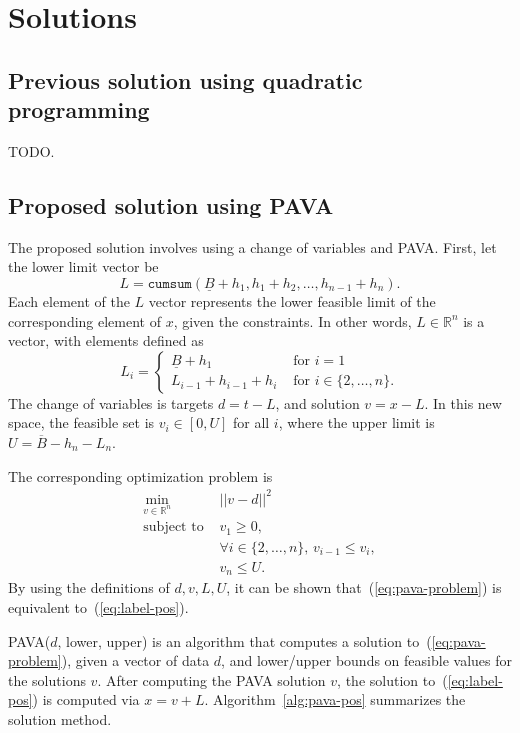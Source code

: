 \documentclass[12pt]{article}
\begin{document}
\section{Solutions}

\subsection{Previous solution using quadratic programming}
TODO.

\subsection{Proposed solution using PAVA}

The proposed solution involves using a change of variables and PAVA.
First, let the lower limit vector be
\begin{equation}
  \label{eq:L}
  L = \texttt{cumsum}(\underline B+h_1, h_1+h_2, \dots, h_{n-1}+h_n).
\end{equation}
Each element of the $L$ vector represents the lower feasible limit of the corresponding element of $x$, given the constraints.
In other words, $L\in\mathbb R^n$ is a vector, with elements defined as
\begin{equation}
  \label{eq:L_i}
  L_i =
  \begin{cases}
    \underline B+h_1 & \text{ for } i=1\\
    L_{i-1}+h_{i-1}+h_i & \text{ for }i\in\{2,\dots, n\}.
  \end{cases}
\end{equation}
The change of variables is targets $d=t-L$, and solution $v=x-L$.
In this new space, the feasible set is $v_i\in [0, U]$ for all $i$, where the upper limit is $U=\overline B-h_n-L_n$.

The corresponding optimization problem is
\begin{equation}
    \label{eq:pava-problem}
\begin{aligned}
  \min_{v\in\mathbb R^n} & ||v-d||^2 \\
  \text{subject to }& v_1 \geq 0 ,\\
                    & \forall i\in\{2, \dots, n\},\, v_{i-1} \leq v_{i},\\
   & v_n\leq U.
\end{aligned}
\end{equation}
By using the definitions of $d,v,L,U$, it can be shown that~(\ref{eq:pava-problem}) is equivalent to~(\ref{eq:label-pos}).

PAVA($d$, lower, upper) is an algorithm that computes a solution to~(\ref{eq:pava-problem}), given a vector of data $d$, and lower/upper bounds on feasible values for the solutions $v$.
After computing the PAVA solution $v$, the solution to~(\ref{eq:label-pos}) is computed via $x=v+L$.
Algorithm~\ref{alg:pava-pos} summarizes the solution method.
\end{document}
